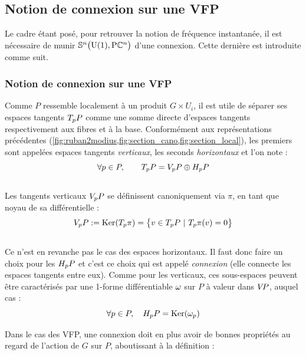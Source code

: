 \subsection{Notion de connexion sur une VFP}
\label{subsec:connexion2VFP}

Le cadre étant posé, pour retrouver la notion de fréquence instantanée, il est nécessaire de munir $\VFP$ d'une connexion. Cette dernière est introduite comme suit.

\subsubsection{Notion de connexion sur une VFP}
\label{subsec:def2conn}

Comme $P$ ressemble localement à un produit $G\times U_i$, il est utile de séparer ses espaces tangents $\tg[p]{P}$ comme une somme directe d'espaces tangents respectivement aux fibres et à la base. Conformément aux représentations précédentes (\cref{fig:ruban2modius,fig:section_cano,fig:section_local}), les premiers sont appelées espaces tangents \emph{verticaux}, les seconds \emph{horizontaux} et l'on note :
\[\forall p\in P,\qquad \tg[p]{P} = \vg[p]{P} \oplus \hg[p]{P}\]
\\
Les tangents verticaux $\vg[p]{P}$ se définissent canoniquement via $\pi$, en tant que noyau de sa différentielle :
\[\vg[p]{P} \defeq \Ker (\tg[p]{\pi}) = \big\{ v\in\tg[p]{P}\ |\ \tg[p]{\pi}(v)=0 \big\}\]
\\ 
Ce n'est en revanche pas le cas des espaces horizontaux. Il faut donc faire un choix pour les $\hg[p]{P}$ et c'est ce choix qui est appelé \emph{connexion} (elle connecte les espaces tangents entre eux).
Comme pour les verticaux, ces sous-espaces peuvent être caractérisés par une 1-forme différentiable $\conn$ sur $P$ à valeur dans $\vg{P}$, auquel cas :
\[\forall p\in P,\quad \hg[p]{P} = \Ker(\conn_p)\]
\skipl

Dans le cas des VFP, une connexion doit en plus avoir de bonnes propriétés au regard de l'action de $G$ sur $P$, aboutissant à la définition :

